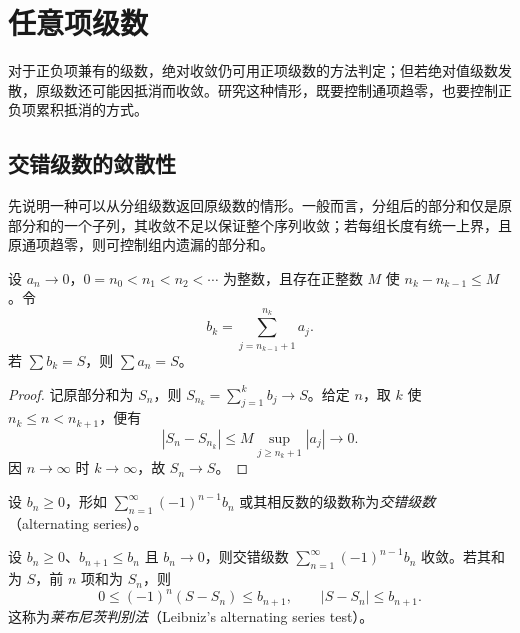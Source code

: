 \section{任意项级数}
\label{sec:general-term-series}

对于正负项兼有的级数，绝对收敛仍可用正项级数的方法判定；但若绝对值级数发散，原级数还可能因抵消而收敛。研究这种情形，既要控制通项趋零，也要控制正负项累积抵消的方式。

\subsection{交错级数的敛散性}
\label{subsec:convergence-of-alternating-series}

先说明一种可以从分组级数返回原级数的情形。一般而言，分组后的部分和仅是原部分和的一个子列，其收敛不足以保证整个序列收敛；若每组长度有统一上界，且原通项趋零，则可控制组内遗漏的部分和。

\begin{theorem}[有界长度分组的逆向结论]
\label{thm:bounded-block-grouping-series}
设 $a_n\to0$，$0=n_0<n_1<n_2<\cdots$ 为整数，且存在正整数 $M$ 使 $n_k-n_{k-1}\leq M$。令
\[
    b_k=\sum_{j=n_{k-1}+1}^{n_k}a_j.
\]
若 $\sum b_k=S$，则 $\sum a_n=S$。
\end{theorem}

\begin{proof}
记原部分和为 $S_n$，则 $S_{n_k}=\sum_{j=1}^k b_j\to S$。给定 $n$，取 $k$ 使 $n_k\leq n<n_{k+1}$，便有
\[
    |S_n-S_{n_k}|
    \leq M\sup_{j\geq n_k+1}|a_j|\longrightarrow0.
\]
因 $n\to\infty$ 时 $k\to\infty$，故 $S_n\to S$。
\end{proof}

\begin{definition}
设 $b_n\geq0$，形如 $\sum_{n=1}^{\infty}(-1)^{n-1}b_n$ 或其相反数的级数称为\emph{交错级数}（alternating series）。
\end{definition}

\begin{theorem}[莱布尼茨判别法及余项估计]
\label{thm:leibniz-alternating-series-test}
设 $b_n\geq0$、$b_{n+1}\leq b_n$ 且 $b_n\to0$，则交错级数 $\sum_{n=1}^{\infty}(-1)^{n-1}b_n$ 收敛。若其和为 $S$，前 $n$ 项和为 $S_n$，则
\begin{equation}
    0\leq(-1)^n(S-S_n)\leq b_{n+1},
    \qquad |S-S_n|\leq b_{n+1}.
    \label{eq:leibniz-series-remainder}
\end{equation}
这称为\emph{莱布尼茨判别法}（Leibniz's alternating series test）。
\end{theorem}

